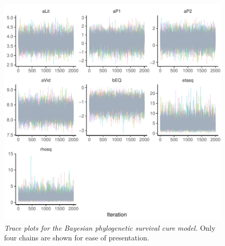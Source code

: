 \documentclass[
  man,floatsintext]{apa6}
\begin{document}
\newpage



\begin{figure}
\centering
\includegraphics{manuscript_files/figure-latex/plotTrace-1.pdf}
\caption{\label{fig:plotTrace}\emph{Trace plots for the Bayesian phylogenetic survival cure model.} Only four chains are shown for ease of presentation.}
\end{figure}

\newpage
\end{document}
